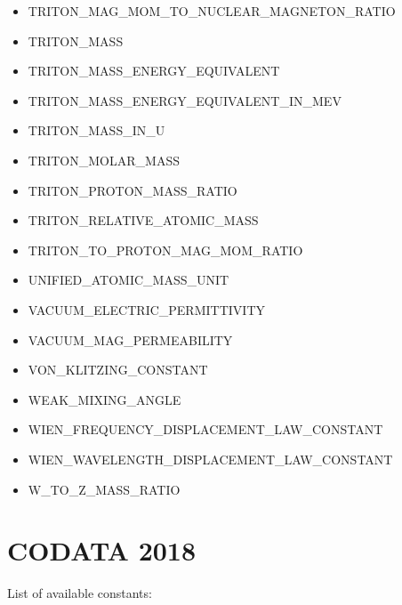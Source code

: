 \begin{itemize}
\item TRITON\_MAG\_MOM\_TO\_NUCLEAR\_MAGNETON\_RATIO
\item TRITON\_MASS
\item TRITON\_MASS\_ENERGY\_EQUIVALENT
\item TRITON\_MASS\_ENERGY\_EQUIVALENT\_IN\_MEV
\item TRITON\_MASS\_IN\_U
\item TRITON\_MOLAR\_MASS
\item TRITON\_PROTON\_MASS\_RATIO
\item TRITON\_RELATIVE\_ATOMIC\_MASS
\item TRITON\_TO\_PROTON\_MAG\_MOM\_RATIO
\item UNIFIED\_ATOMIC\_MASS\_UNIT
\item VACUUM\_ELECTRIC\_PERMITTIVITY
\item VACUUM\_MAG\_PERMEABILITY
\item VON\_KLITZING\_CONSTANT
\item WEAK\_MIXING\_ANGLE
\item WIEN\_FREQUENCY\_DISPLACEMENT\_LAW\_CONSTANT
\item WIEN\_WAVELENGTH\_DISPLACEMENT\_LAW\_CONSTANT
\item W\_TO\_Z\_MASS\_RATIO
\end{itemize}

\section*{CODATA 2018}
List of available constants:

